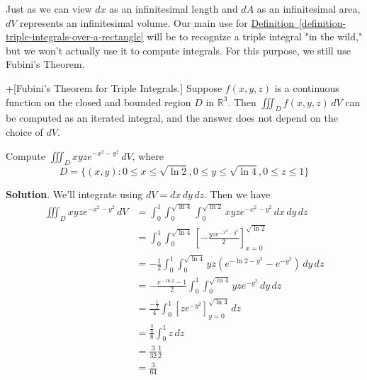 \documentclass[10pt,]{book}
\theoremstyle{ptxplainnotitle}
\theoremstyle{ptxplaintitle}
\theoremstyle{ptxplainnotitle}
\theoremstyle{ptxplaintitle}
\theoremstyle{ptxplainnotitle}
\theoremstyle{ptxplaintitle}
\theoremstyle{ptxdefinitionnotitle}
\theoremstyle{ptxdefinitiontitle}
\theoremstyle{ptxdefinitionnotitle}
\theoremstyle{ptxdefinitiontitle}
\theoremstyle{ptxdefinitionnotitle}
\theoremstyle{ptxdefinitiontitle}
\theoremstyle{ptxdefinitionnotitle}
\theoremstyle{ptxdefinitiontitle}
\theoremstyle{ptxdefinitionnotitle}
\theoremstyle{ptxdefinitiontitle}
\numberwithin{equation}{section}
\newcommand{\RR}{\mathbb{R}}
\begin{document}
 Just as we can view \(dx\) as an infinitesimal length and \(dA\) as an infinitesimal area, \(dV\) represents an infinitesimal volume.%
Our main use for \hyperref[definition-triple-integrals-over-a-rectangle]{Definition~\ref{definition-triple-integrals-over-a-rectangle}} will be to recognize a triple integral "in the wild," but we won't actually use it to compute integrals. For this purpose, we still use Fubini's Theorem.\begin{theorem}+[{Fubini's Theorem for Triple Integrals.}]\label{theorem-fubini-s-theorem-for-triple-integrals}
\hypertarget{p-1164}{}%
Suppose \(f(x,y,z)\) is a continuous function on the closed and bounded region \(D\) in \(\RR^{3}\). Then \(\iiint_{D}f(x,y,z)\,dV\) can be computed as an iterated integral, and the answer does not depend on the choice of \(dV\).%
\end{theorem}
\begin{example}\label{example-a-triple-integral-over-a-rectangular-prism}
\hypertarget{p-1165}{}%
Compute \(\iiint_{D}xyze^{-x^{2} - y^{2}}\,dV\), where%
\begin{equation*}
D = \{(x,y) : 0\leq x\leq\sqrt{\ln2}, 0\leq y\leq\sqrt{\ln4}, 0\leq z\leq 1\}
\end{equation*}
%
\par\smallskip%
\noindent\textbf{Solution}.\hypertarget{solution-186}{}\quad%
\hypertarget{p-1166}{}%
We'll integrate using \(dV = dx\,dy\,dz\). Then we have%
\begin{align*}
\iiint_{D}xyze^{-x^{2} - y^{2}}\,dV & = \int_{0}^{1}\int_{0}^{\sqrt{\ln4}}\int_{0}^{\sqrt{\ln2}} xyze^{-x^{2} - y^{2}}\,dx\,dy\,dz \\
& = \int_{0}^{1}\int_{0}^{\sqrt{\ln4}}\left[-\frac{yze^{-x^{2} - y^{2}}}{2}\right]_{x=0}^{\sqrt{\ln2}} \\
& = -\frac{1}{2}\int_{0}^{1}\int_{0}^{\sqrt{\ln4}} yz(e^{-\ln2 - y^{2}} - e^{-y^{2}})\,dy\,dz \\
& = -\frac{e^{-\ln2} - 1}{2}\int_{0}^{1}\int_{0}^{\sqrt{\ln4}} yze^{-y^{2}}\,dy\,dz \\
& = \frac{-\frac{1}{2}}{4}\int_{0}^{1}\left[ze^{-y^{2}}\right]_{y=0}^{\sqrt{\ln4}}\,dz \\
& = \frac{\frac{3}{4}}{8}\int_{0}^{1}z\,dz \\
& = \frac{3}{32}\frac{1}{2} \\
& = \frac{3}{64} 
\end{align*}
%
\end{example}
\end{document}
